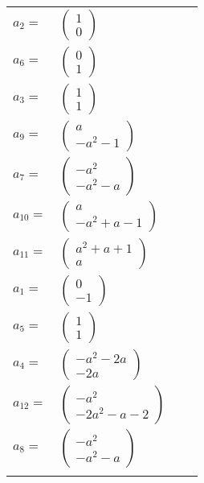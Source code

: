 \documentclass[1p]{elsarticle_modified}
\theoremstyle{definition}
\begin{document}
\begin{tabular}{m{7pt} m{180pt} m{7pt} m{180pt} }
\flushright $a_{2}=$&$\begin{pmatrix}1\\0\end{pmatrix}$ \\
\flushright $a_{6}=$&$\begin{pmatrix}0\\1\end{pmatrix}$ \\
\flushright $a_{3}=$&$\begin{pmatrix}1\\1\end{pmatrix}$ \\
\flushright $a_{9}=$&$\begin{pmatrix}a\\- a^2-1\end{pmatrix}$ \\
\flushright $a_{7}=$&$\begin{pmatrix}- a^2\\- a^2- a\end{pmatrix}$ \\
\flushright $a_{10}=$&$\begin{pmatrix}a\\- a^2+a-1\end{pmatrix}$ \\
\flushright $a_{11}=$&$\begin{pmatrix}a^2+a+1\\a\end{pmatrix}$ \\
\flushright $a_{1}=$&$\begin{pmatrix}0\\-1\end{pmatrix}$ \\
\flushright $a_{5}=$&$\begin{pmatrix}1\\1\end{pmatrix}$ \\
\flushright $a_{4}=$&$\begin{pmatrix}- a^2-2 a\\-2 a\end{pmatrix}$ \\
\flushright $a_{12}=$&$\begin{pmatrix}- a^2\\-2 a^2- a-2\end{pmatrix}$ \\
\flushright $a_{8}=$&$\begin{pmatrix}- a^2\\- a^2- a\end{pmatrix}$\\&\end{tabular}
\end{document}
